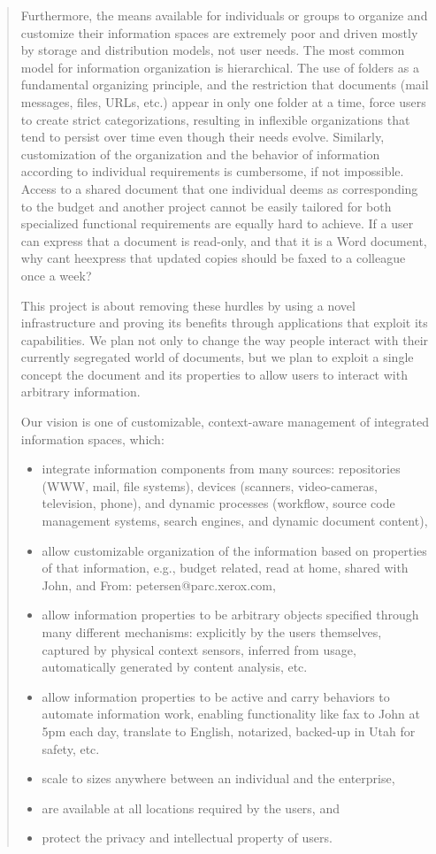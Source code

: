 \begin{quotation}
    Furthermore, the means available for individuals or groups to organize and customize their information spaces are extremely poor and driven mostly by storage and distribution models, not user needs. The most common model for information organization is hierarchical. The use of folders as a fundamental organizing principle, and the restriction that documents (mail messages, files, URLs, etc.) appear in only one folder at a time, force users to create strict categorizations, resulting in inflexible organizations that tend to persist over time even though their needs evolve. Similarly, customization of the organization and the behavior of information according to individual requirements is cumbersome, if not impossible. Access to a shared document that one individual deems as corresponding to the budget and another project cannot be easily tailored for both specialized functional requirements are equally hard to achieve. If a user can express that a document is read-only, and that it is a Word document, why cant heexpress that updated copies should be faxed to a colleague once a week?

    This project is about removing these hurdles by using a novel infrastructure and proving its benefits through applications that exploit its capabilities. We plan not only to change the way people interact with their currently segregated world of documents, but we plan to exploit a single concept the document and its properties to allow users to interact with arbitrary information.

    Our vision is one of customizable, context-aware management of integrated information spaces, which:

    \begin{itemize}

        \item integrate information components from many sources: repositories (WWW, mail, file systems), devices (scanners, video-cameras, television, phone), and dynamic processes (workflow, source code management systems, search engines, and dynamic document content),
        \item allow customizable organization of the information based on properties of that information, e.g., budget related, read at home, shared with John, and From: petersen@parc.xerox.com,
        \item allow information properties to be arbitrary objects specified through many different mechanisms: explicitly by the users themselves, captured by physical context sensors, inferred from usage, automatically generated by content analysis, etc.
        \item allow information properties to be active and carry behaviors to automate information work, enabling functionality like fax to John at 5pm each day, translate to English, notarized, backed-up in Utah for safety, etc.
        \item scale to sizes anywhere between an individual and the enterprise,
        \item are available at all locations required by the users, and
        \item protect the privacy and intellectual property of users.


\end{itemize}
\end{quotation}
